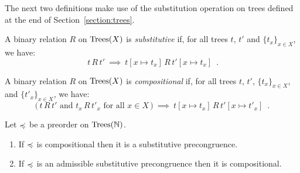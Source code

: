 The next two definitions make use of the substitution operation on trees defined at the end of
Section~\ref{section:trees}.
\begin{definition}[Substitutivity]
    A binary relation $R$ on $\textnormal{Trees}(X)$ is  \emph{substitutive} if,
    for all trees $t$, $t'$ and $\{t_x\}_{x \in X}$, we have:
    \[ \text{$\,t\, R \, t'$} ~ \implies ~ 
       t[ x \mapsto t_x] \, R \, t'[ x \mapsto t_x] \enspace .
    \]
\end{definition}



\begin{definition}[Compositionality]
    A binary relation $R$ on $\textnormal{Trees}(X)$ is \emph{compositional} if, for all 
    trees $t$, $t'$,  $\{t_x\}_{x \in X}$,  and $\{t'_x\}_{x \in X}$, we have:
        \[ \text{($\,t \, R \, t'$ and $t_x \, R \, t'_x$ for all $x \in X\,$)} ~ \implies ~ 
        t[ x \mapsto t_x] \, R \, t'[ x \mapsto t'_x] \enspace .
    \]
\end{definition}



\begin{proposition} 
\label{proposition:substitutive}
Let $\preccurlyeq$ be a preorder  on $\textnormal{Trees}(\mathbb{N})$.
\begin{enumerate} 
\item If  $\preccurlyeq$ is compositional then it is a substitutive precongruence.
\item If $\preccurlyeq$ is an admissible substitutive precongruence then it is compositional.
\end{enumerate}
\end{proposition}

